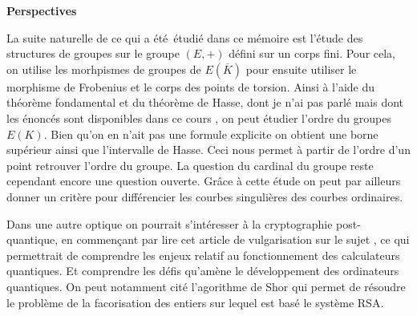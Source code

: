 \newpage
\begin{center}
    \textbf{Perspectives}

    La suite naturelle de ce qui a été étudié dans ce mémoire est l'étude des structures de
    groupes sur le groupe $(E,+)$ défini sur un corps fini. Pour cela, on utilise les
    morhpismes de groupes de $E(\overline{K})$ pour ensuite utiliser le morphisme de Frobenius
    et le corps des points de torsion. Ainsi à l'aide du théorème fondamental et du théorème de
    Hasse, dont je n'ai pas parlé mais dont les énoncés sont disponibles dans ce cours
    \cite[p15-30]{KrausCE}, on peut étudier l'ordre du groupes $E(K)$. Bien qu'on en n'ait pas
    une formule explicite on obtient une borne supérieur ainsi que l'intervalle de Hasse. Ceci
    nous permet à partir de l'ordre d'un point retrouver l'ordre du groupe. La question du
    cardinal du groupe reste cependant encore une question ouverte. Grâce à cette étude on peut
    par ailleurs donner un critère pour différencier les courbes singulières des courbes
    ordinaires.

    Dans une autre optique on pourrait s'intéresser à la cryptographie post-quantique, en
    commençant par lire cet article de vulgarisation sur le sujet \cite{Kachigar2018}, ce qui
    permettrait de comprendre les enjeux relatif au fonctionnement des calculateurs quantiques.
    Et comprendre les défis qu'amène le développement des ordinateurs quantiques. On peut
    notamment cité l'agorithme de Shor qui permet de résoudre le problème de la facorisation
    des entiers sur lequel est basé le système RSA.
\end{center}
